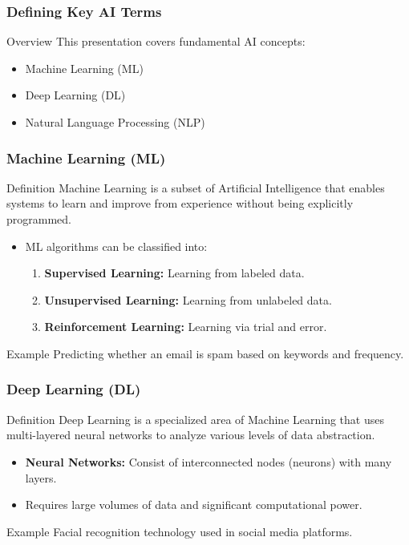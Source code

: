 \documentclass{beamer}
\begin{document}
\begin{frame}[fragile]
    \frametitle{Defining Key AI Terms}
    \begin{block}{Overview}
        This presentation covers fundamental AI concepts:
        \begin{itemize}
            \item Machine Learning (ML)
            \item Deep Learning (DL)
            \item Natural Language Processing (NLP)
        \end{itemize}
    \end{block}
\end{frame}

\begin{frame}[fragile]
    \frametitle{Machine Learning (ML)}
    \begin{block}{Definition}
        Machine Learning is a subset of Artificial Intelligence that enables systems to learn and improve from experience without being explicitly programmed.
    \end{block}

    \begin{itemize}
        \item ML algorithms can be classified into:
        \begin{enumerate}
            \item \textbf{Supervised Learning:} Learning from labeled data.
            \item \textbf{Unsupervised Learning:} Learning from unlabeled data.
            \item \textbf{Reinforcement Learning:} Learning via trial and error.
        \end{enumerate}
    \end{itemize}

    \begin{block}{Example}
        Predicting whether an email is spam based on keywords and frequency.
    \end{block}
\end{frame}

\begin{frame}[fragile]
    \frametitle{Deep Learning (DL)}
    \begin{block}{Definition}
        Deep Learning is a specialized area of Machine Learning that uses multi-layered neural networks to analyze various levels of data abstraction.
    \end{block}

    \begin{itemize}
        \item \textbf{Neural Networks:} Consist of interconnected nodes (neurons) with many layers.
        \item Requires large volumes of data and significant computational power.
    \end{itemize}

    \begin{block}{Example}
        Facial recognition technology used in social media platforms.
    \end{block}
\end{frame}
\end{document}
